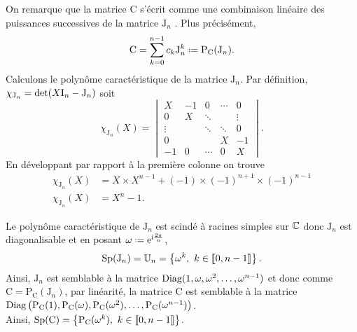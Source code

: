 \begin{preuve}
    On remarque que la matrice $\mathrm{C}$ s'écrit comme une combinaison linéaire des puissances successives de la matrice $\mathrm{J}_n$ \note. Plus précisément, 
    $$\mathrm{C} = \sum_{k=0}^{n-1} c_k \mathrm{J}_n^k \defeq \mathrm{P}_{\mathrm{C}}(\mathrm{J}_n).$$
    Calculons le polynôme caractéristique de la matrice $\mathrm{J}_n$. Par définition, $\chi_{\mathrm{J}_n} = \det(X \mathrm{I}_n - \mathrm{J}_n)$ soit 
    $$
        \chi_{\mathrm{J}_n}(X) = 
        \begin{vmatrix}
        X & -1 & 0 & \cdots & 0 \\
        0 & X & \ddots & & \vdots \\
        \vdots & & \ddots & \ddots & 0 \\
        0 & & & X & -1 \\
        -1 & 0 & \cdots & 0 & X
        \end{vmatrix}.
    $$
    En développant par rapport à la première colonne on trouve
    \begin{align*}
        \chi_{\mathrm{J}_n}(X) &= X \times X^{n-1} + (-1) \times (-1)^{n+1} \times (-1)^{n-1} \\
        \chi_{\mathrm{J}_n}(X) &= X^n-1.
    \end{align*}
    
    Le polynôme caractéristique de $\mathrm{J}_n$ est scindé à racines simples sur $\mathbb{C}$ donc $\mathrm{J}_n$ est diagonalisable et en posant $\omega \defeq \me^{\mi \frac{2 \pi}{n}}$, 
    $$\mathrm{Sp}(\mathrm{J}_n) = \mathbb{U}_n = \left \{ \omega^k,\ k \in \llbracket 0, n-1 \rrbracket \right \}.$$
    Ainsi, $\mathrm{J}_n$ est semblable à la matrice $\mathrm{Diag}(1, \omega, \omega^2, \dots, \omega^{n-1})$ et donc comme $\mathrm{C} = \mathrm{P}_{\mathrm{C}}(\mathrm{J}_n)$, par linéarité, la matrice $\mathrm{C}$ est semblable à  la matrice $\mathrm{Diag} \left(\mathrm{P}_\mathrm{C}(1), \mathrm{P}_\mathrm{C}(\omega), \mathrm{P}_\mathrm{C}(\omega^2), \dots,\mathrm{P}_\mathrm{C}(\omega^{n-1}) \right)$. \\
    Ainsi, $\mathrm{Sp}(\mathrm{C}) = \left \{ \mathrm{P}_\mathrm{C}(\omega^k),\ k \in \llbracket 0, n-1 \rrbracket \right \}$.
\end{preuve}    

